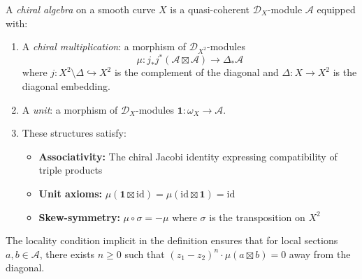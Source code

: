 \begin{definition}\label{def:chiral-algebra}
A \emph{chiral algebra} on a smooth curve $X$ is a quasi-coherent $\mathcal{D}_X$-module $\mathcal{A}$ equipped with:
\begin{enumerate}
\item A \emph{chiral multiplication}: a morphism of $\mathcal{D}_{X^2}$-modules
\[
\mu: j_*j^*(\mathcal{A} \boxtimes \mathcal{A}) \to \Delta_*\mathcal{A}
\]
where $j: X^2 \setminus \Delta \hookrightarrow X^2$ is the complement of the diagonal and $\Delta: X \to X^2$ is the diagonal embedding.

\item A \emph{unit}: a morphism of $\mathcal{D}_X$-modules $\mathbf{1}: \omega_X \to \mathcal{A}$.

\item These structures satisfy:
\begin{itemize}
\item \textbf{Associativity:} The chiral Jacobi identity expressing compatibility of triple products
\item \textbf{Unit axioms:} $\mu(\mathbf{1} \boxtimes \text{id}) = \mu(\text{id} \boxtimes \mathbf{1}) = \text{id}$
\item \textbf{Skew-symmetry:} $\mu \circ \sigma = -\mu$ where $\sigma$ is the transposition on $X^2$
\end{itemize}
\end{enumerate}
The locality condition implicit in the definition ensures that for local sections $a, b \in \mathcal{A}$, there exists $n \geq 0$ such that $(z_1 - z_2)^n \cdot \mu(a \boxtimes b) = 0$ away from the diagonal.
\end{definition}

